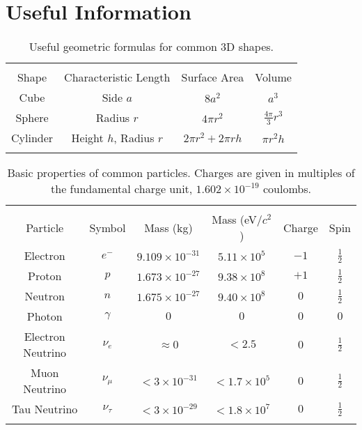 \documentclass[12pt]{article}
\begin{document}
\section{Useful Information}

\begin{table}[!h]
\begin{tabular}{cccc}
\hline\hline\\
Shape & Characteristic Length & Surface Area & Volume \\
\hline
Cube & Side $a$ & $8a^2$ & $a^3$\\
Sphere & Radius $r$ & $4\pi r^2$ & $\frac{4\pi}{3}r^3$\\
Cylinder & Height $h$, Radius $r$ & $2\pi r^2  + 2\pi rh$
& $\pi r^2 h$ \\
\hline\hline\\
\end{tabular}
\caption{Useful geometric formulas for common 3D shapes.}
\end{table}

\begin{table}[!h]
\begin{tabular}{cccccc}
\hline\hline\\
Particle & Symbol & Mass (kg) & Mass (eV/$c^2$) & Charge & Spin \\
\hline
Electron &$e^-$& $9.109\times10^{-31}$ & $5.11\times10^5$ 
  & $-1$ & $\frac{1}{2}$\\
Proton & $p$ & $1.673\times10^{-27}$ & $9.38\times10^8$ 
  & $+1$ & $\frac{1}{2}$\\
Neutron & $n$ &  $1.675\times10^{-27}$ & $9.40\times10^8$ 
  & $0$ & $\frac{1}{2}$\\
Photon & $\gamma$ & $0$ & $0$ & $0$ & $0$\\
Electron Neutrino & $\nu_e$& $\approx 0$ & $< 2.5$ & $0$ & $\frac{1}{2}$\\
Muon Neutrino & $\nu_\mu$ & $< 3\times10^{-31}$ & $< 1.7\times10^5$ 
  & $0$ & $\frac{1}{2}$\\
Tau Neutrino & $\nu_\tau$ & $< 3\times10^{-29}$ & $< 1.8\times10^7$ 
  & $0$ & $\frac{1}{2}$\\
\hline\hline\\
\end{tabular}
\caption{Basic properties of common particles.  Charges are given
in multiples of the fundamental charge unit, $1.602\times10^{-19}$ coulombs.}
\end{table}
\end{document}
